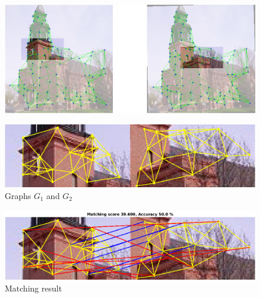 \documentclass[
	fontsize=12pt,
	paper=a4,
	twoside=false,
	numbers=noenddot,
	plainheadsepline,
	toc=listof,
	toc=bibliography
]{scrartcl}
\begin{document}
\begin{figure} [htb] \centering
	\includegraphics[scale = 0.35]{test6/subregions.png}
\end{figure}
\begin{figure} [hb] \centering
	\includegraphics[scale = 0.4]{test6/subgraphs.png}
	\caption{Graphs $G_1$ and $G_2$}
\end{figure}
\begin{figure} [htb] \centering
	\includegraphics[scale = 0.4]{test6/matching_result.png}
	\caption{ Matching result}
\end{figure}

\FloatBarrier
\end{document}
